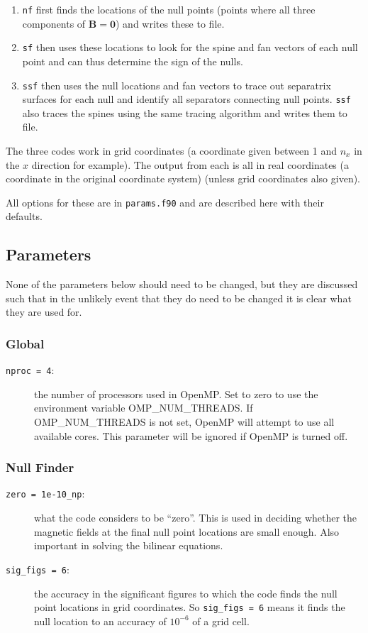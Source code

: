 \documentclass[12pt]{article}
\renewcommand{\vec}[1]{\mathbf{#1}}
\begin{document}
    \begin{enumerate}
      \item \texttt{nf} first finds the locations of the null points (points where all three components of \( \vec{B} = \vec{0} \)) and writes these to file.
      \item \texttt{sf} then uses these locations to look for the spine and fan vectors of each null point and can thus determine the sign of the nulls.
      \item \texttt{ssf} then uses the null locations and fan vectors to trace out separatrix surfaces for each null and identify all separators connecting null points. \texttt{ssf} also traces the spines using the same tracing algorithm and writes them to file.
    \end{enumerate}
    The three codes work in grid coordinates (a coordinate given between 1 and \( n_x \) in the \( x \) direction for example). The output from each is all in real coordinates (a coordinate in the original coordinate system) (unless grid coordinates also given).

    All options for these are in \texttt{params.f90} and are described here with their defaults.
    
    \subsection{Parameters}
      \label{sec:params}

      None of the parameters below should need to be changed, but they are discussed such that in the unlikely event that they do need to be changed it is clear what they are used for.
      
      \subsubsection{Global}
        \begin{description}
          \item [\texttt{nproc = 4}:] the number of processors used in OpenMP. Set to zero to use the environment variable OMP\_NUM\_THREADS. If OMP\_NUM\_THREADS is not set, OpenMP will attempt to use all available cores. This parameter will be ignored if OpenMP is turned off.
        \end{description}

      \subsubsection{Null Finder}
        \begin{description}
          \item [\texttt{zero = 1e-10\_np}:] what the code considers to be ``zero''. This is used in deciding whether the magnetic fields at the final null point locations are small enough. Also important in solving the bilinear equations.
          \item [\texttt{sig\_figs = 6}:] the accuracy in the significant figures to which the code finds the null point locations in grid coordinates. So \texttt{sig\_figs = 6} means it finds the null location to an accuracy of \( 10^{-6} \) of a grid cell.
        \end{description}
\end{document}
